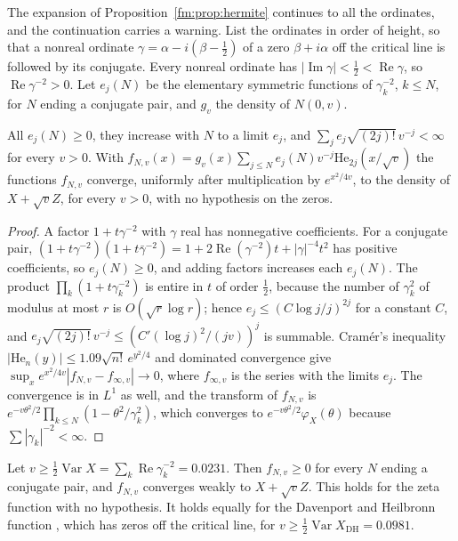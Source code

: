 The expansion of Proposition~\ref{fm:prop:hermite} continues to all the ordinates, and the continuation carries a warning. List the ordinates in order of height, so that a nonreal ordinate $\gamma=\alpha-i(\beta-\frac12)$ of a zero $\beta+i\alpha$ off the critical line is followed by its conjugate. Every nonreal ordinate has $|\operatorname{Im}\gamma|<\frac12<\operatorname{Re}\gamma$, so $\operatorname{Re}\gamma^{-2}>0$. Let $e_j(N)$ be the elementary symmetric functions of $\gamma_k^{-2}$, $k\le N$, for $N$ ending a conjugate pair, and $g_v$ the density of $N(0,v)$.

\begin{proposition}[proved]\label{fm:prop:hermiteinf}
All $e_j(N)\ge0$, they increase with $N$ to a limit $e_j$, and $\sum_je_j\sqrt{(2j)!}\,v^{-j}<\infty$ for every $v>0$. With $f_{N,v}(x)=g_v(x)\sum_{j\le N}e_j(N)v^{-j}\mathrm{He}_{2j}(x/\sqrt v)$ the functions $f_{N,v}$ converge, uniformly after multiplication by $e^{x^2/4v}$, to the density of $X+\sqrt vZ$, for every $v>0$, with no hypothesis on the zeros.
\end{proposition}

\begin{proof}
A factor $1+t\gamma^{-2}$ with $\gamma$ real has nonnegative coefficients. For a conjugate pair, $(1+t\gamma^{-2})(1+t\bar\gamma^{-2})=1+2\operatorname{Re}(\gamma^{-2})t+|\gamma|^{-4}t^2$ has positive coefficients, so $e_j(N)\ge0$, and adding factors increases each $e_j(N)$. The product $\prod_k(1+t\gamma_k^{-2})$ is entire in $t$ of order $\frac12$, because the number of $\gamma_k^2$ of modulus at most $r$ is $O(\sqrt r\log r)$; hence $e_j\le(C\log j/j)^{2j}$ for a constant $C$, and $e_j\sqrt{(2j)!}\,v^{-j}\le(C'(\log j)^2/(jv))^j$ is summable. Cram\'er's inequality $|\mathrm{He}_n(y)|\le1.09\sqrt{n!}\,e^{y^2/4}$ and dominated convergence give $\sup_xe^{x^2/4v}|f_{N,v}-f_{\infty,v}|\to0$, where $f_{\infty,v}$ is the series with the limits $e_j$. The convergence is in $L^1$ as well, and the transform of $f_{N,v}$ is $e^{-v\theta^2/2}\prod_{k\le N}(1-\theta^2/\gamma_k^2)$, which converges to $e^{-v\theta^2/2}\varphi_X(\theta)$ because $\sum|\gamma_k|^{-2}<\infty$.
\end{proof}

\begin{proposition}\label{fm:prop:heightpos}
Let $v\ge\frac12\operatorname{Var}X=\sum_k\operatorname{Re}\gamma_k^{-2}=0.0231$. Then $f_{N,v}\ge0$ for every $N$ ending a conjugate pair, and $f_{N,v}$ converges weakly to $X+\sqrt vZ$. This holds for the zeta function with no hypothesis. It holds equally for the Davenport and Heilbronn function \cite{DH36}, which has zeros off the critical line, for $v\ge\frac12\operatorname{Var}X_{\mathrm{DH}}=0.0981$.
\end{proposition}

